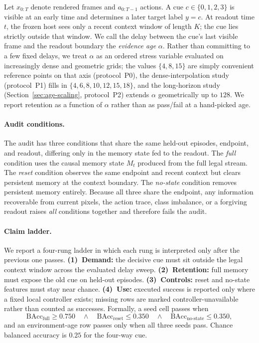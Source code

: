 Let $x_{0:T}$ denote rendered frames and $a_{0:T-1}$ actions.  A cue $c \in
\{0,1,2,3\}$ is visible at an early time and determines a later target label
$y=c$.  At readout time $t$, the frozen host sees only a recent context window
of length $K$; the cue lies strictly outside that window.  We call the delay
between the cue's last visible frame and the readout boundary the
\emph{evidence age} $\alpha$.  Rather than committing to a few fixed delays, we
treat $\alpha$ as an ordered stress variable evaluated on increasingly dense and
geometric grids; the values $\{4,8,15\}$ are simply convenient reference points
on that axis (protocol~P0), the dense-interpolation study (protocol~P1) fills in
$\{4,6,8,10,12,15,18\}$, and the long-horizon study
(Section~\ref{sec:age-scaling}, protocol~P2) extends $\alpha$ geometrically up to
$128$.  We report retention as a function of $\alpha$ rather than as pass/fail at
a hand-picked age.

\paragraph{Audit conditions.}
The audit has three conditions that share the same held-out episodes, endpoint,
and readout, differing only in the memory state fed to the readout.
The \emph{full} condition uses the causal memory state $M_t$ produced from the
full legal stream.  The \emph{reset} condition observes the same endpoint and
recent context but clears persistent memory at the context boundary.  The
\emph{no-state} condition removes persistent memory entirely.  Because all three
share the endpoint, any information recoverable from current pixels, the action
trace, class imbalance, or a forgiving readout raises \emph{all} conditions
together and therefore fails the audit.

\paragraph{Claim ladder.}
We report a four-rung ladder in which each rung is interpreted only after the
previous one passes.  \textbf{(1)~Demand:} the decisive cue must sit outside the
legal context window across the evaluated delay sweep.  \textbf{(2)~Retention:} full memory must
expose the old cue on held-out episodes.  \textbf{(3)~Controls:} reset and
no-state features must stay near chance.  \textbf{(4)~Use:} executed success is
reported only where a fixed local controller exists; missing rows are marked
controller-unavailable rather than counted as successes.  Formally, a seed cell
passes when
\begin{equation}
\mathrm{BAcc}_{\text{full}} \ge 0.750
\quad\wedge\quad
\mathrm{BAcc}_{\text{reset}} \le 0.350
\quad\wedge\quad
\mathrm{BAcc}_{\text{no-state}} \le 0.350,
\label{eq:gate}
\end{equation}
and an environment-age row passes only when all three seeds pass.  Chance
balanced accuracy is $0.25$ for the four-way cue.

